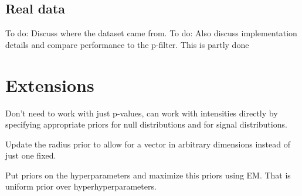 \documentclass[12pt]{article}
\begin{document}
\subsection{Real data}
To do: Discuss where the dataset came from. 
To do: Also discuss implementation details and compare performance to the p-filter. This is partly done 

\section{Extensions}
Don't need to work with just p-values, can work with intensities directly by specifying appropriate priors for null distributions
and for signal distributions. 

Update the radius prior to allow for a vector in arbitrary dimensions instead of just one fixed. 

Put priors on the hyperparameters and maximize this priors using EM. That is uniform prior over hyperhyperparameters. 




\end{document}
